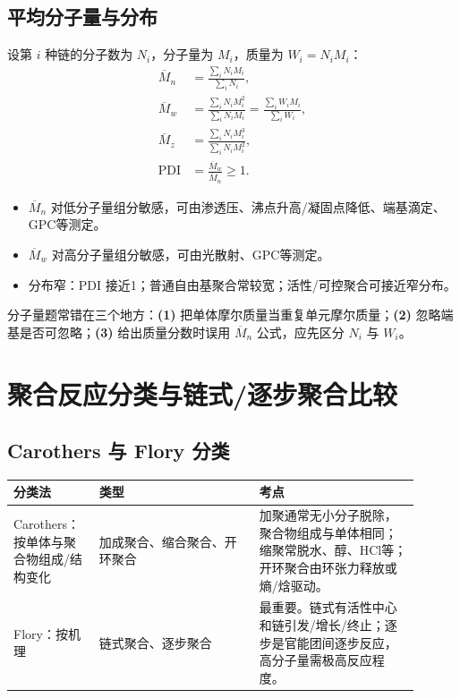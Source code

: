 \documentclass[UTF8,a4paper,10pt,twocolumn]{ctexart}
\newcommand{\Mn}{\overline{M}_n}
\newcommand{\Mw}{\overline{M}_w}
\newcommand{\Mz}{\overline{M}_z}
\newcommand{\PDI}{\mathrm{PDI}}
\begin{document}
\subsection{平均分子量与分布}
设第 $i$ 种链的分子数为 $N_i$，分子量为 $M_i$，质量为 $W_i=N_iM_i$：
\begin{align*}
  \Mn  & =\frac{\sum_i N_iM_i}{\sum_i N_i},                                       \\
  \Mw  & =\frac{\sum_i N_iM_i^2}{\sum_i N_iM_i}=\frac{\sum_i W_iM_i}{\sum_i W_i}, \\
  \Mz  & =\frac{\sum_i N_iM_i^3}{\sum_i N_iM_i^2},                                \\
  \PDI & =\frac{\Mw}{\Mn}\ge 1.
\end{align*}
\begin{itemize}
  \item $\Mn$ 对低分子量组分敏感，可由渗透压、沸点升高/凝固点降低、端基滴定、GPC等测定。
  \item $\Mw$ 对高分子量组分敏感，可由光散射、GPC等测定。
  \item 分布窄：$\PDI$ 接近1；普通自由基聚合常较宽；活性/可控聚合可接近窄分布。
\end{itemize}
\begin{pitfall}
  分子量题常错在三个地方：\textbf{(1)} 把单体摩尔质量当重复单元摩尔质量；\textbf{(2)} 忽略端基是否可忽略；\textbf{(3)} 给出质量分数时误用 $\Mn$ 公式，应先区分 $N_i$ 与 $W_i$。
\end{pitfall}

\section{聚合反应分类与链式/逐步聚合比较}
\subsection{Carothers 与 Flory 分类}
\begin{center}
  \scriptsize
  \begin{tabularx}{\linewidth}{p{0.18\linewidth}p{0.36\linewidth}p{0.36\linewidth}}
    \toprule
    分类法                      & 类型             & 考点                                                   \\
    \midrule
    Carothers：按单体与聚合物组成/结构变化 & 加成聚合、缩合聚合、开环聚合 & 加聚通常无小分子脱除，聚合物组成与单体相同；缩聚常脱水、醇、HCl等；开环聚合由环张力释放或熵/焓驱动。 \\
    Flory：按机理                & 链式聚合、逐步聚合      & 最重要。链式有活性中心和链引发/增长/终止；逐步是官能团间逐步反应，高分子量需极高反应程度。       \\
    \bottomrule
  \end{tabularx}
\end{center}
\end{document}
